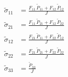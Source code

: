 \begin{align}
\tilde{\sigma}_{11} &= \frac{F_{11}\,\tilde{P}_{11}+F_{12}\,\tilde{P}_{12}}{J} \\ 
\tilde{\sigma}_{21} &= \frac{F_{11}\,\tilde{P}_{21}+F_{12}\,\tilde{P}_{22}}{J} \\ 
\tilde{\sigma}_{12} &= \frac{F_{21}\,\tilde{P}_{11}+F_{22}\,\tilde{P}_{12}}{J} \\ 
\tilde{\sigma}_{22} &= \frac{F_{21}\,\tilde{P}_{21}+F_{22}\,\tilde{P}_{22}}{J} \\ 
\tilde{\sigma}_{33} &= \frac{\tilde{P}_{33}}{J} 
\end{align}
